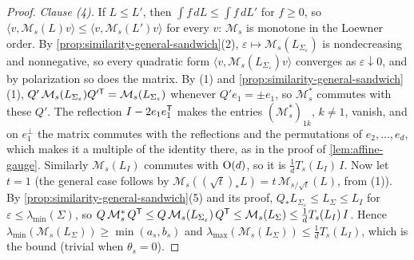 \begin{proof}
\emph{Clause (4).} If $L \le L'$, then $\int f\,dL \le \int f\,dL'$ for $f \ge 0$, so
$\langle v,\mathcal M_s(L)v\rangle \le \langle v,\mathcal M_s(L')v\rangle$ for every $v$: $\mathcal M_s$ is monotone in the
Loewner order. By \ref{prop:similarity-general-sandwich}(2), $\varepsilon \mapsto \mathcal M_s(L_{\Sigma_\varepsilon})$ is
nondecreasing and nonnegative, so every quadratic form $\langle v,\mathcal M_s(L_{\Sigma_\varepsilon})v\rangle$ converges as
$\varepsilon \downarrow 0$, and by polarization so does the matrix. By (1) and
\ref{prop:similarity-general-sandwich}(1), $Q'\,\mathcal M_s(L_{\Sigma_\varepsilon})Q'^{\mathsf{T}} = \mathcal M_s(L_{\Sigma_\varepsilon})$ whenever
$Q'e_1 = \pm e_1$, so $\mathcal M_s^*$ commutes with these $Q'$. The reflection $I - 2e_1e_1^{\mathsf{T}}$ makes the entries
$(\mathcal M_s^*)_{1k}$, $k \ne 1$, vanish, and on $e_1^\perp$ the matrix commutes with the reflections and the
permutations of $e_2,\dots,e_d$, which makes it a multiple of the identity there, as in the proof of
\ref{lem:affine-gauge}. Similarly $\mathcal M_s(L_I)$ commutes with $\mathrm{O}(d)$, so it is $\tfrac1dT_s(L_I)\,I$. Now let
$t = 1$ (the general case follows by $\mathcal M_s((\sqrt t)_*L) = t\,\mathcal M_{s/\sqrt t}(L)$, from (1)). By
\ref{prop:similarity-general-sandwich}(5) and its proof, $Q_*L_{\Sigma_\varepsilon} \le L_\Sigma \le L_I$ for
$\varepsilon \le \lambda_{\min}(\Sigma)$, so
$Q\,\mathcal M_s^*\,Q^{\mathsf{T}} \le Q\,\mathcal M_s(L_{\Sigma_\varepsilon})\,Q^{\mathsf{T}} \le \mathcal M_s(L_\Sigma) \le \tfrac1dT_s(L_I)\,I$. Hence
$\lambda_{\min}(\mathcal M_s(L_\Sigma)) \ge \min(a_s,b_s)$ and $\lambda_{\max}(\mathcal M_s(L_\Sigma)) \le \tfrac1dT_s(L_I)$,
which is the bound (trivial when $\theta_s = 0$).
\end{proof}

